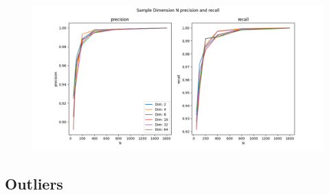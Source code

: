 \begin{figure}[h!]
    \includegraphics[width=\linewidth]{../images/toyexperiments/ksampledim/sampleDimN_precision_recall.png} 
\end{figure}

\subsection{Outliers}

